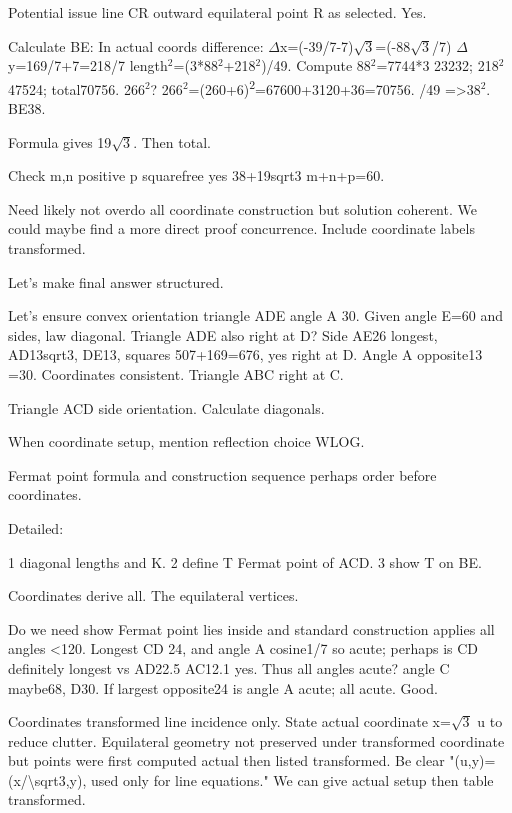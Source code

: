 \begin{decodedreasoningpanel}
Potential issue line CR outward equilateral point R as selected. Yes.

Calculate BE:
In actual coords difference:
\ensuremath{\Delta}x=(-39/7-7)\ensuremath{\sqrt{3}}=(-88\ensuremath{\sqrt{3}}/7)
\ensuremath{\Delta}y=169/7+7=218/7
length\ensuremath{^2}=(3*88\ensuremath{^2}+218\ensuremath{^2})/49.
Compute 88\ensuremath{^2}=7744*3 23232; 218\ensuremath{^2} 47524; total70756. 266\ensuremath{^2}? 266\ensuremath{^2}=(260+6)\textsuperscript{2}=67600+3120+36=70756. /49 =\textgreater{}38\ensuremath{^2}. BE38.

Formula gives 19\ensuremath{\sqrt{3}}. Then total.

Check m,n positive p squarefree yes 38+19sqrt3 m+n+p=60.

Need likely not overdo all coordinate construction but solution coherent. We could maybe find a more direct proof concurrence. Include coordinate labels transformed.

Let's make final answer structured.

Let's ensure convex orientation triangle ADE angle A 30. Given angle E=60 and sides, law diagonal. Triangle ADE also right at D? Side AE26 longest, AD13sqrt3, DE13, squares 507+169=676, yes right at D. Angle A opposite13 =30. Coordinates consistent. Triangle ABC right at C.

Triangle ACD side orientation. Calculate diagonals.

When coordinate setup, mention reflection choice WLOG.

Fermat point formula and construction sequence perhaps order before coordinates.

Detailed:

1 diagonal lengths and K.
2 define T Fermat point of ACD.
3 show T on BE.

Coordinates derive all. The equilateral vertices.

Do we need show Fermat point lies inside and standard construction applies all angles \textless{}120. Longest CD 24, and angle A cosine1/7 so acute; perhaps is CD definitely longest vs AD22.5 AC12.1 yes. Thus all angles acute? angle C maybe68, D30. If largest opposite24 is angle A acute; all acute. Good.

Coordinates transformed line incidence only. State actual coordinate x=\ensuremath{\sqrt{3}} u to reduce clutter. Equilateral geometry not preserved under transformed coordinate but points were first computed actual then listed transformed. Be clear "(u,y)=(x/\textbackslash{}sqrt3,y), used only for line equations." We can give actual setup then table transformed.


\end{decodedreasoningpanel}
